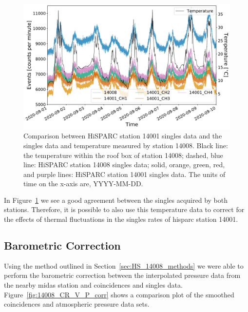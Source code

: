 \begin{figure}[ht!]
	\centering
	\includegraphics[width=0.9\columnwidth]{HS_14008_vs_14001_and_temp.pdf}
	\caption{Comparison between HiSPARC station 14001 singles data and the singles data and temperature measured by station 14008. Black line: the temperature within the roof box of station 14008; dashed, blue line: HiSPARC station 14008 singles data; solid, orange, green, red, and purple lines: HiSPARC station 14001 singles data. The units of time on the x-axis are, YYYY-MM-DD.}
	\label{fig:HS_14008_14001_vs_T}
\end{figure}

In Figure~\ref{fig:HS_14008_14001_vs_T} we see a good agreement between the singles acquired by both stations. Therefore, it is possible to also use this temperature data to correct for the effects of thermal fluctuations in the singles rates of \gls{hisparc} station 14001.



\subsection{Barometric Correction}\label{sec:HS_14008_P_corr}


Using the method outlined in Section~\ref{sec:HS_14008_methods} we were able to perform the barometric correction between the interpolated pressure data from the nearby \gls{midas} station and coincidences and singles data. Figure~\ref{fig:14008_CR_V_P_corr} shows a comparison plot of the smoothed coincidences and atmospheric pressure data sets.



